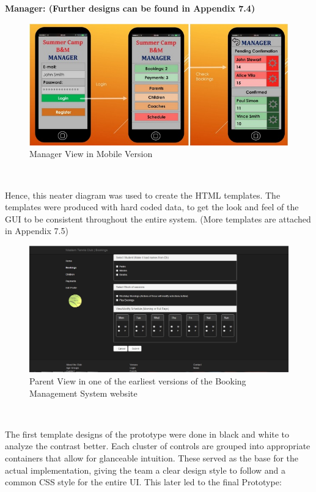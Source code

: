 \documentclass{l3proj}
\begin{document}
\\
\\ \textbf{Manager: (Further designs can be found in Appendix 7.4)}
\\
{
\begin{figure}[h]
\caption{Manager View in Mobile Version}
\centering
\includegraphics[scale=0.60]{diagramdraft2Manager.jpg}
\end{figure}
}
\\
\par
Hence, this neater diagram was used to create the HTML templates. The templates were produced with hard coded data, to get the look and feel of the GUI to be consistent throughout the entire system. (More templates are attached in Appendix 7.5)
\\
{
\begin{figure}[h]
\caption{Parent View in one of the earliest versions of the Booking Management System website}
\centering
\includegraphics[scale=0.35]{parent_template.jpg}
\end{figure}
}
\\
\par
The first template designs of the prototype were done in black and white to analyze the contrast better. Each cluster of controls are grouped into appropriate containers that allow for glanceable intuition. These served as the base for the actual implementation, giving the team a clear design style to follow and a common CSS style for the entire UI. This later led to the final Prototype:
\end{document}
